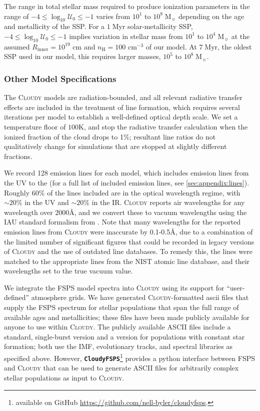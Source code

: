 \documentclass[linenumbers, tighten, trackchanges]{aastex61}%
\newcommand{\Sec}[1]{\autoref{sec:#1}}
\newcommand{\FSPS}{{\sc FSPS}\xspace}
\newcommand{\CloudyFSPS}{{\tt \textbf{CloudyFSPS}}\xspace}
\newcommand{\Cloudy}{\textsc{Cloudy}\xspace}
\newcommand{\logten}{\ensuremath{\log_{10}}}
\newcommand\Msun{\ensuremath{\mathrm{M_{\sun}}}}
\newcommand{\nH}{\ensuremath{n_{\mathrm{H}}}}
\newcommand{\cm}[1]{\ensuremath{\mathrm{cm}^{#1}}}
\newcommand{\ang}{\ensuremath{\mbox{\AA}}}
\newcommand{\Rin}{\ensuremath{R_{\mathrm{inner}}}}
\newcommand{\logU}{\ensuremath{\logten \mathcal{U}_0}}
\begin{document}
The range in total stellar mass required to produce ionization parameters in the range of $-4 \leq \logU \leq -1$ varies from $10^1$ to $10^8\;\Msun$ depending on the age and metallicity of the SSP. For a $1\;$Myr solar-metallicity SSP, $-4 \leq \logU \leq -1$ implies variation in stellar mass from $10^1$ to $10^4\;\Msun$ at the assumed $\Rin{} = 10^{19}$ cm and $\nH=100$ \cm{-3} of our model. At $7\;$Myr, the oldest SSP used in our model, this requires larger masses, $10^5$ to $10^8\;\Msun$.

\subsubsection{Other Model Specifications}\label{sec:methods:cloudy:other}

The \Cloudy models are radiation-bounded, and all relevant radiative transfer effects are included in the treatment of line formation, which requires several iterations per model to establish a well-defined optical depth scale. We set a temperature floor of $100$K, and stop the radiative transfer calculation when the ionized fraction of the cloud drops to 1\%; resultant line ratios do not qualitatively change for simulations that are stopped at slightly different fractions.

We record 128 emission lines for each model, which includes emission lines from the UV to the (for a full list of included emission lines, see \Sec{appendix:lines}). Roughly 60\% of the lines included are in the optical wavelength regime, with ${\sim20}\%$ in the UV and ${\sim}20\%$ in the IR. \Cloudy reports air wavelengths for any wavelength over $2000\ang$, and we convert these to vacuum wavelengths using the IAU standard formalism from \citet{Morton1991}. Note that many wavelengths for the reported emission lines from \Cloudy were inaccurate by 0.1-0.5\ang{}, due to a combination of the limited number of significant figures that could be recorded in legacy versions of \Cloudy and the use of outdated line databases. To remedy this, the lines were matched to the appropriate lines from the NIST atomic line database, and their wavelengths set to the true vacuum value.

We integrate the \FSPS model spectra into \Cloudy using its support for ``user-defined'' atmosphere grids. We have generated \Cloudy-formatted ascii files that supply the \FSPS spectrum for stellar populations that span the full range of available ages and metallicities; these files have been made publicly available for anyone to use within \Cloudy. The publicly available ASCII files include a standard, single-burst version and a version for populations with constant star formation; both use the IMF, evolutionary tracks, and spectral libraries as specified above. However, \CloudyFSPS\footnote{available on GitHub \url{https://github.com/nell-byler/cloudyfsps}.} provides a python interface between \FSPS and \Cloudy that can be used to generate ASCII files for arbitrarily complex stellar populations as input to \Cloudy.
\end{document}
